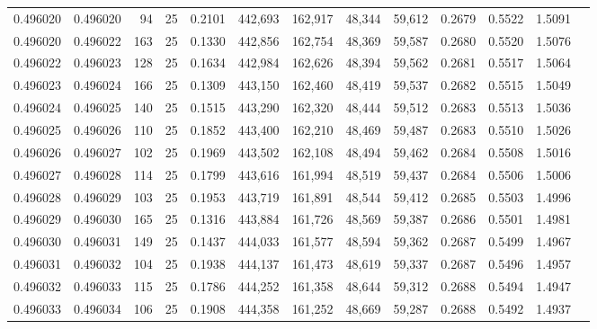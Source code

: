 \begin{tabular}{rrrrrrrrrrrrr}
0.496020 & 0.496020 &    94 &  25 &                                     0.2101 & 442,693 & 162,917 &  48,344 &  59,612 & 0.2679 & 0.5522 & 1.5091 \\
0.496020 & 0.496022 &   163 &  25 &                                     0.1330 & 442,856 & 162,754 &  48,369 &  59,587 & 0.2680 & 0.5520 & 1.5076 \\
0.496022 & 0.496023 &   128 &  25 &                                     0.1634 & 442,984 & 162,626 &  48,394 &  59,562 & 0.2681 & 0.5517 & 1.5064 \\
0.496023 & 0.496024 &   166 &  25 &                                     0.1309 & 443,150 & 162,460 &  48,419 &  59,537 & 0.2682 & 0.5515 & 1.5049 \\
0.496024 & 0.496025 &   140 &  25 &                                     0.1515 & 443,290 & 162,320 &  48,444 &  59,512 & 0.2683 & 0.5513 & 1.5036 \\
0.496025 & 0.496026 &   110 &  25 &                                     0.1852 & 443,400 & 162,210 &  48,469 &  59,487 & 0.2683 & 0.5510 & 1.5026 \\
0.496026 & 0.496027 &   102 &  25 &                                     0.1969 & 443,502 & 162,108 &  48,494 &  59,462 & 0.2684 & 0.5508 & 1.5016 \\
0.496027 & 0.496028 &   114 &  25 &                                     0.1799 & 443,616 & 161,994 &  48,519 &  59,437 & 0.2684 & 0.5506 & 1.5006 \\
0.496028 & 0.496029 &   103 &  25 &                                     0.1953 & 443,719 & 161,891 &  48,544 &  59,412 & 0.2685 & 0.5503 & 1.4996 \\
0.496029 & 0.496030 &   165 &  25 &                                     0.1316 & 443,884 & 161,726 &  48,569 &  59,387 & 0.2686 & 0.5501 & 1.4981 \\
0.496030 & 0.496031 &   149 &  25 &                                     0.1437 & 444,033 & 161,577 &  48,594 &  59,362 & 0.2687 & 0.5499 & 1.4967 \\
0.496031 & 0.496032 &   104 &  25 &                                     0.1938 & 444,137 & 161,473 &  48,619 &  59,337 & 0.2687 & 0.5496 & 1.4957 \\
0.496032 & 0.496033 &   115 &  25 &                                     0.1786 & 444,252 & 161,358 &  48,644 &  59,312 & 0.2688 & 0.5494 & 1.4947 \\
0.496033 & 0.496034 &   106 &  25 &                                     0.1908 & 444,358 & 161,252 &  48,669 &  59,287 & 0.2688 & 0.5492 & 1.4937 \\

\end{tabular}
